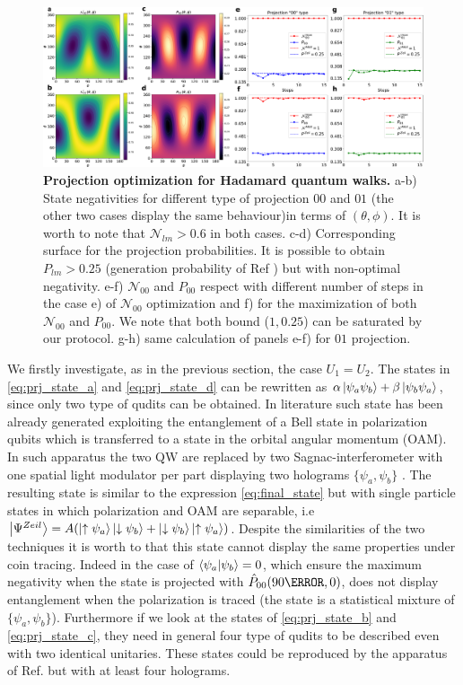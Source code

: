 \documentclass[
	aps, pra, authorblock, superscriptaddress, twocolumn,
	10pt
]{revtex4-1}
\begin{document}
\begin{figure}[t]
    \centering
    \includegraphics[width=\textwidth]{proj.pdf}
    \caption{\textbf{Projection optimization for Hadamard quantum walks.} a-b) State negativities for different type of projection $00$ and $01$ (the other two cases display the same behaviour)in terms of $(\theta, \phi)$. It is worth to note that $\mathcal{N}_{lm}>0.6$ in both cases. c-d) Corresponding surface for the projection probabilities. It is possible to obtain $P_{lm}> 0.25$ (generation probability of Ref \cite{fickler2012quantum}) but with non-optimal negativity. e-f) $\mathcal{N}_{00}$ and $P_{00}$ respect with different number of steps in the case e) of $\mathcal{N}_{00}$ optimization and f) for the maximization of both $\mathcal{N}_{00}$ and $P_{00}$. We note that both bound ($1, 0.25$) can be saturated by our protocol. g-h) same calculation of panels e-f) for $01$ projection.}
    \label{fig:10steps_results}
\end{figure}
We firstly investigate, as in the previous section, the case $U_1 = U_2$. The states in \cref{eq:prj_state_a} and  \cref{eq:prj_state_d} can be rewritten as $\alpha \ket{\psi_a \psi_b} + \beta \ket{\psi_b \psi_a}$, since only two type of qudits can be obtained. In literature such state has been already generated exploiting the entanglement of a Bell state in polarization qubits which is transferred to a state in the orbital angular momentum (OAM). In such apparatus the two QW are replaced by two Sagnac-interferometer with one spatial light modulator per part displaying two holograms $\{\psi_a, \psi_b\}$ \cite{fickler2012quantum}. The resulting state is similar to the expression \cref{eq:final_state} but with single particle states in which polarization and OAM are separable, i.e $\ket{\Psi^{Zeil}}=A(\ket{\uparrow \psi_a}\ket{\downarrow \psi_b} +\ket{\downarrow \psi_b} \ket{\uparrow \psi_a})$. Despite the similarities of the two techniques it is worth to that this state cannot display the same properties under coin tracing. Indeed in the case of $\braket{\psi_a}{ \psi_b}=0$, which ensure the maximum negativity when the state is projected with $\hat{P}_{00}(90\degree,0)$, does not display entanglement when the polarization is traced (the state is a statistical mixture of $\{\psi_a, \psi_b\}$). Furthermore if we look at the states of \cref{eq:prj_state_b} and \cref{eq:prj_state_c}, they need in general four type of qudits to be described even with two identical unitaries. These states could be reproduced by the apparatus of Ref. \cite{fickler2012quantum} but with at least four holograms.
\end{document}
